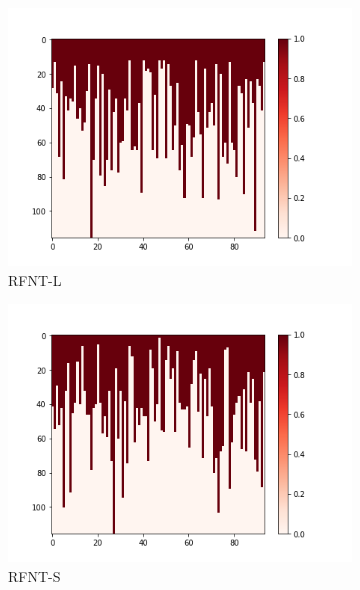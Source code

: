 \documentclass[10pt, conference, compsocconf]{IEEEtran}
\begin{document}
\begin{figure}[h!]
\begin{subfigure}[b]{0.4\linewidth}
                  \includegraphics[width=\columnwidth]{figures/5vs7_random-triangular-largest_04_training}
                  \caption{RFNT-L}
                  \label{fig:triangular-L-Sample-Training-set}
        \end{subfigure}
        \begin{subfigure}[b]{0.4\linewidth}
                  \includegraphics[width=\columnwidth]{figures/5vs7_random-triangular-smallest_04_training}
                  \caption{RFNT-S}
                  \label{fig:triangular-S-Sample-Training-set}
        \end{subfigure}
        \begin{subfigure}[b]{0.4\linewidth}

\end{subfigure}
\end{figure}
\end{document}
